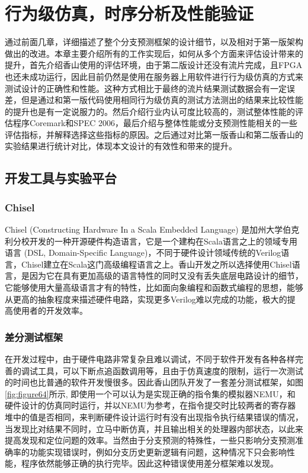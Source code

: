 \chapter{行为级仿真，时序分析及性能验证}

通过前面几章，详细描述了整个分支预测框架的设计细节，以及相对于第一版架构做出的改进。本章主要介绍所有的工作实现后，如何从多个方面来评估设计带来的提升，首先介绍香山使用的评估环境，由于第二版设计还没有流片完成，且FPGA也还未成功运行，因此目前仍然是使用在服务器上用软件进行行为级仿真的方式来测试设计的正确性和性能。这种方式相比于最终的流片结果测试数据会有一定误差，但是通过和第一版代码使用相同行为级仿真的测试方法测出的结果来比较性能的提升也是有一定说服力的。然后介绍行业内认可度比较高的，测试整体性能的评估程序Coremark和SPEC 2006，最后介绍与整体性能或分支预测性能相关的一些评估指标，并解释选择这些指标的原因。之后通过对比第一版香山和第二版香山的实验结果进行统计对比，体现本文设计的有效性和带来的提升。

\section{开发工具与实验平台}

\subsection{Chisel}

Chisel (Constructing Hardware In a Scala Embedded Language) 是加州大学伯克利分校开发的一种开源硬件构造语言，它是一个建构在Scala语言\cite{scala}之上的领域专用语言 (DSL, Domain-Specific Language)，不同于硬件设计领域传统的Verilog语言，Chisel建立在Scala这门高级编程语言之上。香山开发之所以选择使用Chisel语言，是因为它在具有更加高级的语言特性的同时又没有丢失底层电路设计的细节，它能够使用大量高级语言才有的特性，比如面向象编程和函数式编程的思想，能够从更高的抽象程度来描述硬件电路，实现更多Verilog难以完成的功能，极大的提高使用者的开发效率。

\subsection{差分测试框架}

在开发过程中，由于硬件电路非常复杂且难以调试，不同于软件开发有各种各样完善的调试工具，可以下断点追函数调用等，且由于仿真速度的限制，运行一次测试的时间也比普通的软件开发慢很多。因此香山团队开发了一套差分测试框架，如图\ref{fig:figure64}所示, 即使用一个可以认为是实现正确的指令集的模拟器NEMU\cite{nemu}，和硬件设计的仿真同时运行，并以NEMU为参考，在指令提交时比较两者的寄存器堆中的值是否相同，来判断硬件设计运行时有没有出现指令执行结果错误的情况，当发现比对结果不同时，立马中断仿真，并且输出相关的处理器内部状态，以此来提高发现和定位问题的效率。当然由于分支预测的特殊性，一些只影响分支预测准确率的功能实现错误时，例如分支历史更新逻辑有问题，这种情况下只会影响性能，程序依然能够正确的执行完毕。因此这种错误使用差分框架难以发现。

